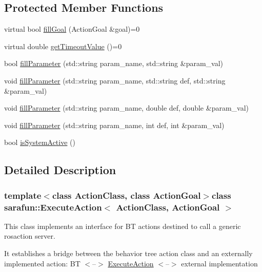 \subsection*{Protected Member Functions}
\begin{DoxyCompactItemize}
\item 
virtual bool \hyperlink{classsarafun_1_1ExecuteAction_a6dd9c0f013d15a17d7e7ce8dbe40a436}{fill\-Goal} (Action\-Goal \&goal)=0
\item 
virtual double \hyperlink{classsarafun_1_1ExecuteAction_aba6cfa8a8ce19e735eb6394424df6d17}{get\-Timeout\-Value} ()=0
\item 
bool \hyperlink{classsarafun_1_1ExecuteAction_ac1c8c1ac7392b0ebc8d095d6f6d336e3}{fill\-Parameter} (std\-::string param\-\_\-name, std\-::string \&param\-\_\-val)
\item 
void \hyperlink{classsarafun_1_1ExecuteAction_a78aa73f154cebe28d4c2fa11ec6a07cf}{fill\-Parameter} (std\-::string param\-\_\-name, std\-::string def, std\-::string \&param\-\_\-val)
\item 
void \hyperlink{classsarafun_1_1ExecuteAction_a0c5d656feaf29da583e87f8389570e7d}{fill\-Parameter} (std\-::string param\-\_\-name, double def, double \&param\-\_\-val)
\item 
void \hyperlink{classsarafun_1_1ExecuteAction_a0ab753300e7535025e7d0508335241a6}{fill\-Parameter} (std\-::string param\-\_\-name, int def, int \&param\-\_\-val)
\item 
bool \hyperlink{classsarafun_1_1ExecuteAction_ab9adb2cd743cb8e783fe2a927c94232b}{is\-System\-Active} ()
\end{DoxyCompactItemize}


\subsection{Detailed Description}
\subsubsection*{template$<$class Action\-Class, class Action\-Goal$>$class sarafun\-::\-Execute\-Action$<$ Action\-Class, Action\-Goal $>$}

This class implements an interface for B\-T actions destined to call a generic rosaction server.

It establishes a bridge between the behavior tree action class and an externally implemented action\-: B\-T $<$--$>$ \hyperlink{classsarafun_1_1ExecuteAction}{Execute\-Action} $<$--$>$ external implementation 

